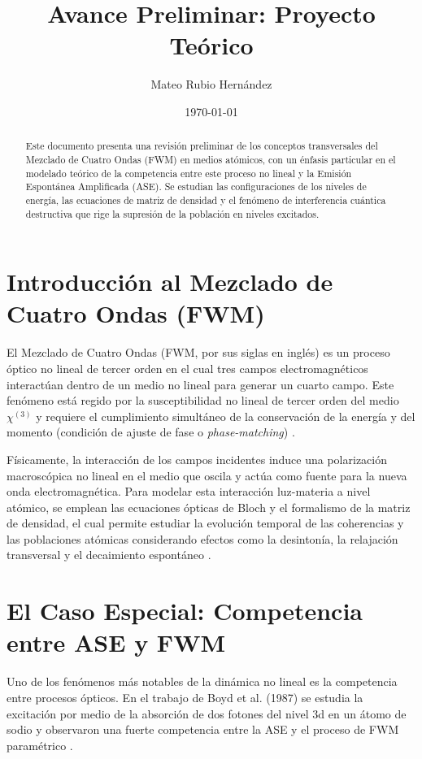 \documentclass[12pt,a4paper]{article}
\title{Avance Preliminar: Proyecto Teórico}
\author{Mateo Rubio Hernández}
\date{\today}
\begin{document}
\maketitle

\begin{abstract}
Este documento presenta una revisión preliminar de los conceptos transversales del Mezclado de Cuatro Ondas (FWM) en medios atómicos, con un énfasis particular en el modelado teórico de la competencia entre este proceso no lineal y la Emisión Espontánea Amplificada (ASE). Se estudian las configuraciones de los niveles de energía, las ecuaciones de matriz de densidad y el fenómeno de interferencia cuántica destructiva que rige la supresión de la población en niveles excitados.
\end{abstract}

\section{Introducción al Mezclado de Cuatro Ondas (FWM)}
El Mezclado de Cuatro Ondas (FWM, por sus siglas en inglés) es un proceso óptico no lineal de tercer orden en el cual tres campos electromagnéticos interactúan dentro de un medio no lineal para generar un cuarto campo. Este fenómeno está regido por la susceptibilidad no lineal de tercer orden del medio $\chi^{(3)}$ y requiere el cumplimiento simultáneo de la conservación de la energía y del momento (condición de ajuste de fase o \textit{phase-matching}) \cite{Becerra2008}.

Físicamente, la interacción de los campos incidentes induce una polarización macroscópica no lineal en el medio que oscila y actúa como fuente para la nueva onda electromagnética. Para modelar esta interacción luz-materia a nivel atómico, se emplean las ecuaciones ópticas de Bloch y el formalismo de la matriz de densidad, el cual permite estudiar la evolución temporal de las coherencias y las poblaciones atómicas considerando efectos como la desintonía, la relajación transversal y el decaimiento espontáneo \cite{Documento2025}.

\section{El Caso Especial: Competencia entre ASE y FWM}
Uno de los fenómenos más notables de la dinámica no lineal es la competencia 
entre procesos ópticos. En el trabajo de Boyd et al. (1987) se estudia la excitación 
por medio de la absorción de dos fotones del nivel 3d en un átomo de sodio y 
observaron una fuerte competencia entre la ASE y el proceso de FWM paramétrico \cite{Boyd1987}.
\end{document}
